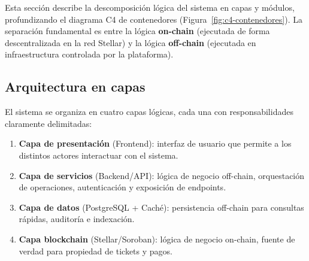 \documentclass[12pt,oneside]{article}
\begin{document}
Esta sección describe la descomposición lógica del sistema en capas y módulos, profundizando el diagrama C4 de contenedores (Figura~\ref{fig:c4-contenedores}). La separación fundamental es entre la lógica \textbf{on-chain} (ejecutada de forma descentralizada en la red Stellar) y la lógica \textbf{off-chain} (ejecutada en infraestructura controlada por la plataforma).

\subsection{Arquitectura en capas}

El sistema se organiza en cuatro capas lógicas, cada una con responsabilidades claramente delimitadas:

\begin{enumerate}
  \item \textbf{Capa de presentación} (Frontend): interfaz de usuario que permite a los distintos actores interactuar con el sistema.
  \item \textbf{Capa de servicios} (Backend/API): lógica de negocio off-chain, orquestación de operaciones, autenticación y exposición de endpoints.
  \item \textbf{Capa de datos} (PostgreSQL + Caché): persistencia off-chain para consultas rápidas, auditoría e indexación.
  \item \textbf{Capa blockchain} (Stellar/Soroban): lógica de negocio on-chain, fuente de verdad para propiedad de tickets y pagos.
\end{enumerate}
\end{document}

